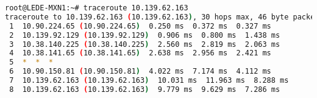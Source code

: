 \begin{lstlisting}[language=bash, caption={Traceroute from LEDE-MXN1 to AV-Ajuntament-Avinyonet.}]
root@LEDE-MXN1:~# traceroute 10.139.62.163
traceroute to 10.139.62.163 (10.139.62.163), 30 hops max, 46 byte packets
 1  10.90.224.65 (10.90.224.65)  0.250 ms  0.372 ms  0.327 ms
 2  10.139.92.129 (10.139.92.129)  0.906 ms  0.800 ms  1.438 ms
 3  10.38.140.225 (10.38.140.225)  2.560 ms  2.819 ms  2.063 ms
 4  10.38.141.65 (10.38.141.65)  2.638 ms  2.956 ms  2.421 ms
 5  *  *  *
 6  10.90.150.81 (10.90.150.81)  4.022 ms  7.174 ms  4.112 ms
 7  10.139.62.163 (10.139.62.163)  10.031 ms  11.963 ms  8.288 ms
 8  10.139.62.163 (10.139.62.163)  9.779 ms  9.629 ms  7.286 ms
\end{lstlisting}
